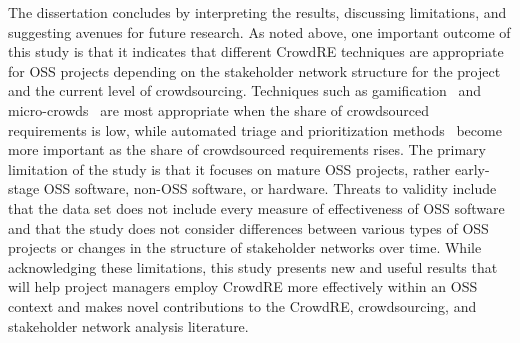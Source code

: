 The dissertation concludes by interpreting the results, discussing limitations, and suggesting avenues for future research. As noted above, one important outcome of this study is that it indicates that different CrowdRE techniques are appropriate for OSS projects depending on the stakeholder network structure for the project and the current level of crowdsourcing. Techniques such as gamification~\cite{dalpiaz} and micro-crowds~\cite{levy} are most appropriate when the share of crowdsourced requirements is low, while automated triage and prioritization methods~\cite{lim} become more important as the share of crowdsourced requirements rises. The primary limitation of the study is that it focuses on mature OSS projects, rather early-stage OSS software, non-OSS software, or hardware. Threats to validity include that the data set does not include every measure of effectiveness of OSS software and that the study does not consider differences between various types of OSS projects or changes in the structure of stakeholder networks over time. While acknowledging these limitations, this study presents new and useful results that will help project managers employ CrowdRE more effectively within an OSS context and makes novel contributions to the CrowdRE, crowdsourcing, and stakeholder network analysis literature.